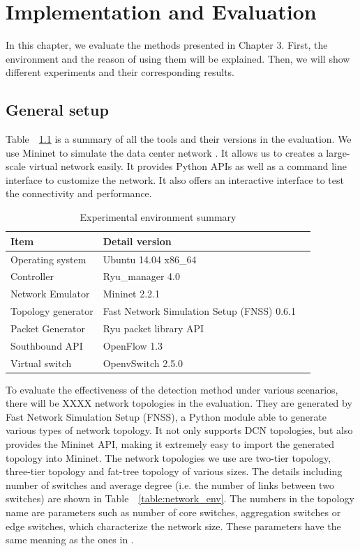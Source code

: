 \chapter{Implementation and Evaluation}
\label{Implementation_and_Evaluation}
In this chapter, we evaluate the methods presented in Chapter 3. First, the environment and the reason of using them will be explained. Then, we will show different experiments and their corresponding results.

\section{General setup}
Table~~\ref{table:Experiment_table} is a summary of all the tools and their versions in the evaluation. We use Mininet to simulate the data center network \cite{Mininet}. It allows us to creates a large-scale virtual network easily. It provides Python APIs as well as a command line interface to customize the network. It also offers an interactive interface to test the connectivity and performance.

\begin{table}[H]
\centering
\caption{Experimental environment summary}
\begin{tabular}{|l|p{4cm}|p{4.5cm}}
\hline Item & Detail version \\
\hline
\hline Operating system & Ubuntu 14.04 x86\_64 \\
\hline Controller & Ryu\_manager 4.0 \\
\hline Network Emulator & Mininet 2.2.1 \\
\hline Topology generator & Fast Network Simulation Setup (FNSS) 0.6.1\\
\hline Packet Generator & Ryu packet library API \\
\hline Southbound API & OpenFlow 1.3 \\
\hline Virtual switch & OpenvSwitch 2.5.0 \\
\hline 
\end{tabular}
\label{table:Experiment_table}
\end{table}

To evaluate the effectiveness of the detection method under various scenarios, there will be XXXX network topologies in the evaluation. They are generated by Fast Network Simulation Setup (FNSS), a Python module able to generate various types of network topology. It not only supports DCN topologies, but also provides the Mininet API, making it extremely easy to import the generated topology into Mininet. The network topologies we use are two-tier topology, three-tier topology and fat-tree topology of various sizes. The details including number of switches and average degree (i.e. the number of links between two switches) are shown in Table~~\ref{table:network_env}. The numbers in the topology name are parameters such as number of core switches, aggregation switches or edge switches, which characterize the network size. These parameters have the same meaning as the ones in \cite{FNSS}.

